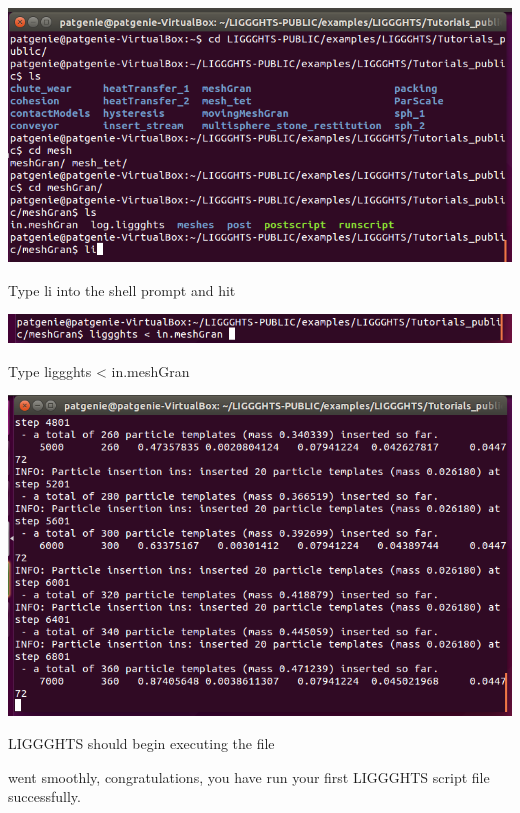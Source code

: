 \documentclass{tufte-book} %
\begin{document}
 \begin{marginfigure}
   \includegraphics[width=\linewidth]{graphics/Screenshot/Lig10.png}
   \caption{Type li into the shell prompt and hit}
 \end{marginfigure}
  \begin{marginfigure}
   \includegraphics[width=\linewidth]{graphics/Screenshot/Lig11.png}
   \caption{Type liggghts < in.meshGran}
 \end{marginfigure}
  \begin{marginfigure}
   \includegraphics[width=\linewidth]{graphics/Screenshot/Lig12.png}
   \caption{LIGGGHTS should begin executing the file}
 \end{marginfigure}
  went smoothly, congratulations, you have run your first LIGGGHTS script file successfully.
\end{document}
